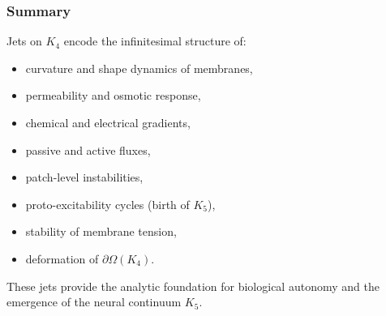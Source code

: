 \subsubsection{Summary}

Jets on $K_4$ encode the infinitesimal structure of:

\begin{itemize}
    \item curvature and shape dynamics of membranes,
    \item permeability and osmotic response,
    \item chemical and electrical gradients,
    \item passive and active fluxes,
    \item patch-level instabilities,
    \item proto-excitability cycles (birth of $K_5$),
    \item stability of membrane tension,
    \item deformation of $\partial\Omega(K_4)$.
\end{itemize}

These jets provide the analytic foundation for biological autonomy and
the emergence of the neural continuum $K_5$.
